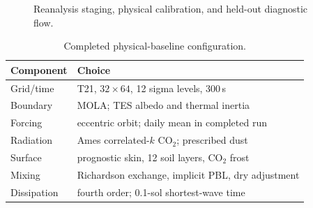 \documentclass{article}
\begin{document}
\begin{figure}[t]
\centering
{}
\caption{Reanalysis staging, physical calibration, and held-out diagnostic flow.}
\label{fig:data}
\end{figure}

\begin{table}[t]
\centering\small
\caption{Completed physical-baseline configuration.}\label{tab:config}
\begin{tabular}{ll}\toprule
Component & Choice\\\midrule
Grid/time & T21, \(32\times64\), 12 sigma levels, 300\,s\\
Boundary & MOLA; TES albedo and thermal inertia\\
Forcing & eccentric orbit; daily mean in completed run\\
Radiation & Ames correlated-\(k\) CO\(_2\); prescribed dust\\
Surface & prognostic skin, 12 soil layers, CO\(_2\) frost\\
Mixing & Richardson exchange, implicit PBL, dry adjustment\\
Dissipation & fourth order; 0.1-sol shortest-wave time\\\bottomrule
\end{tabular}
\end{table}
\end{document}
